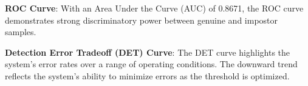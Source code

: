 \textbf{ROC Curve}: With an Area Under the Curve (AUC) of 0.8671, the ROC curve demonstrates strong discriminatory power between genuine and impostor samples.

\textbf{Detection Error Tradeoff (DET) Curve}: The DET curve highlights the system's error rates over a range of operating conditions. The downward trend reflects the system's ability to minimize errors as the threshold is optimized.